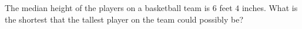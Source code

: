 The median height of the players on a basketball team is $6$ feet $4$ inches. What is the shortest that the tallest player on the team could possibly be?
